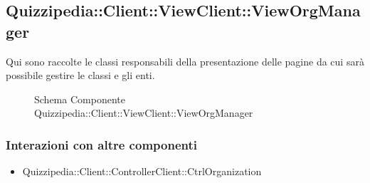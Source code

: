 \subsection{Quizzipedia::Client::ViewClient::ViewOrgManager}
Qui sono raccolte le classi responsabili della presentazione delle pagine da cui sarà possibile gestire le classi e gli enti.
\begin{figure}[H]
\centering
\noindent{}
\caption[Quizzipedia::Client::ViewClient::ViewOrgManager]{Schema Componente Quizzipedia::Client::ViewClient::ViewOrgManager}
\end{figure}
\subsubsection{Interazioni con altre componenti}
\begin{itemize}
\item Quizzipedia::Client::ControllerClient::CtrlOrganization
\end{itemize}
